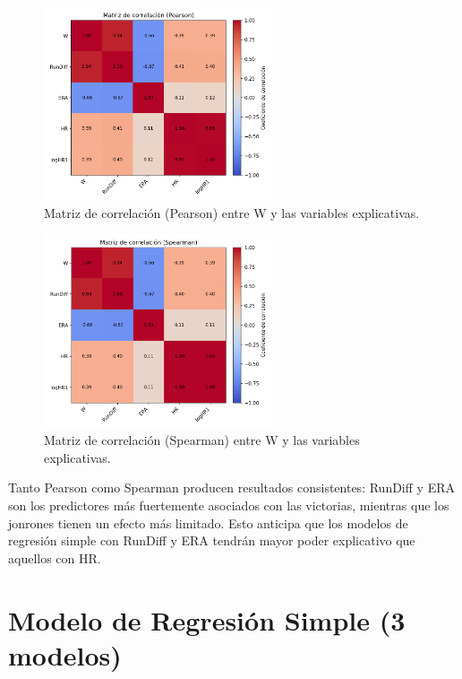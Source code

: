 \documentclass[man,floatsintext]{apa7}
\begin{document}
\begin{figure}[H]
    \centering
    \includegraphics[width=0.6\textwidth]{../plots/heatmap_corr_pearson.png}
    \caption{Matriz de correlación (Pearson) entre W y las variables explicativas.}
    \label{fig:heatmap_pearson}
\end{figure}

\begin{figure}[H]
    \centering
    \includegraphics[width=0.6\textwidth]{../plots/heatmap_corr_spearman.png}
    \caption{Matriz de correlación (Spearman) entre W y las variables explicativas.}
    \label{fig:heatmap_spearman}
\end{figure}

Tanto Pearson como Spearman producen resultados consistentes: RunDiff y ERA son los predictores más fuertemente asociados con las victorias, mientras que los jonrones tienen un efecto más limitado. Esto anticipa que los modelos de regresión simple con RunDiff y ERA tendrán mayor poder explicativo que aquellos con HR.
\section{Modelo de Regresión Simple (3 modelos)}
\end{document}
